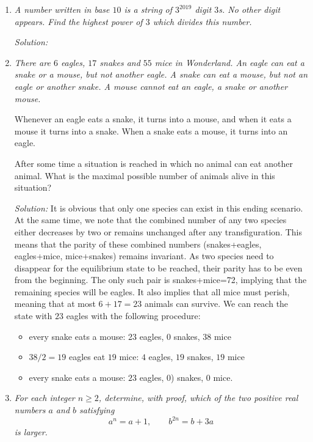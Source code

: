 \documentclass{article}
\begin{document}
\begin{enumerate}[1.]
\vspace{6.81mm}

\item %
{\itshape
A number written in base $10$ is a string of $3^{2019}$ digit $3$s.
No other digit appears.
Find the highest power of $3$ which divides this number.}

\textit{Solution:}

\vspace{6.81mm}

\item %
{\itshape
There are $6$ eagles, $17$ snakes and $55$ mice in Wonderland.
An eagle can eat a snake or a mouse, but not another eagle.
A snake can eat a mouse, but not an eagle or another snake.
A mouse cannot eat an eagle, a snake or another mouse.

Whenever an eagle eats a snake, it turns into a mouse, and when it eats a mouse it turns into a snake. When a snake eats a mouse, it turns into an eagle.

After some time a situation is reached in which no animal can eat another animal.
What is the maximal possible number of animals alive in this situation?}

\textit{Solution:}
It is obvious that only one species can exist in this ending scenario. At the same time, we note that the combined number of any two species either decreases by two or remains unchanged after any transfiguration. This means that the parity of these combined numbers (snakes+eagles, eagles+mice, mice+snakes) remains invariant.
As two species need to disappear for the equilibrium state to be reached, their parity has to be even from the beginning. The only such pair is snakes+mice=72, implying that the remaining species will be eagles.
It also implies that all mice must perish, meaning that at most $6+17=23$ animals can survive. We can reach the state with $23$ eagles with the following procedure:
\begin{itemize}
  \item every snake eats a mouse: 23 eagles, 0 snakes, 38 mice
  \item $38/2=19$ eagles eat $19$ mice: $4$ eagles, $19$ snakes, $19$ mice
  \item every snake eats a mouse: $23$ eagles, $0$) snakes, $0$ mice.
\end{itemize}

\vspace{6.81mm}

\item %
{\itshape
For each integer $n \geq 2$, determine, with proof, which of the two positive real numbers $a$ and $b$ satisfying
\[ a^n = a+1, \qquad b^{2n} = b+3a \]
is larger.}


\end{enumerate}
\end{document}
